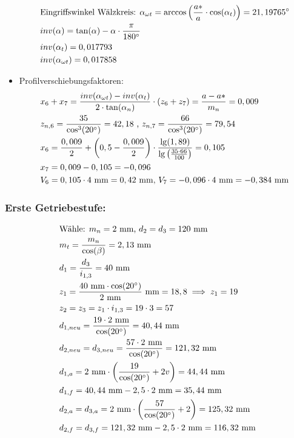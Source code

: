 \begin{itemize}
\begin{align*}
	&\text{Eingriffswinkel Wälzkreis: } \alpha_{\omega t} = \arccos \left( \frac{a*}{a} \cdot \cos(\alpha_t)\right) = 21,19765 ^\circ \\
	&inv(\alpha) = \tan(\alpha) -\alpha \cdot \frac{\pi}{180^\circ} \\
	&inv(\alpha_t) = 0,017793 \\
	&inv(\alpha_{\omega t}) = 0,017858 
\end{align*}
\item Profilverschiebungsfaktoren:
\begin{align*}
	&x_6 + x_7 = \frac{inv(\alpha_{\omega t})-inv(\alpha_{t})}{2 \cdot \tan(\alpha_n)} \cdot (z_6 + z_7) = \frac{a - a*}{m_n} = 0,009 \\
	&z_{n,6} = \frac{35}{\cos^3(20^\circ)} = 42,18 \text{ , }z_{n,7} = \frac{66}{\cos^3(20^\circ)} = 79,54 \\
	&x_6 =\frac{0,009}{2} + \left( 0,5 - \frac{0,009}{2} \right) \cdot \frac{\lg(1,89)}{\lg\left( \frac{35 \cdot 66}{100} \right)} = 0,105 \\
	&x_7 = 0,009 - 0,105 = - 0,096 \\ 
	&V_6 = 0,105 \cdot 4 \text{ mm} = 0,42 \text{ mm, }V_7 = -0,096\cdot 4 \text{ mm} = -0,384 \text{ mm} 
	\end{align*}
\end{itemize}
\subsubsection{Erste Getriebestufe:}
\begin{align*}
	&\text{Wähle: } m_n= 2\text{ mm, } d_2 = d_3 = 120 \text{ mm} \\
	&m_t =  \frac{m_n}{\cos(\beta)} = 2,13 \text{ mm} \\
	&d_1 = \frac{d_3}{i_{1,3}} = 40 \text{ mm} \\
	&z_1 = \frac{40 \text{ mm} \cdot \cos(20^\circ)}{2 \text{ mm}} \text{ mm} = 18,8 \implies z_1 = 19\\
	&z_2=z_3 = z_1 \cdot i_{1,3} =19 \cdot 3 = 57 \\
	&d_{1,neu} = \frac{19 \cdot 2 \text{ mm}}{\cos(20^\circ)} = 40,44 \text{ mm} \\
	&d_{2,neu} = d_{3,neu} = \frac{57 \cdot 2 \text{ mm}}{\cos(20^\circ)} = 121,32 \text{ mm} \\
	&d_{1,a} = 2\text{ mm} \cdot \left(\frac{19}{\cos(20^\circ)}+2v\right) =44,44\text{ mm} \\
	&d_{1,f} = 40,44\text{ mm} -2,5 \cdot 2\text{ mm} =35,44\text{ mm} \\
	&d_{2,a} = d_{3,a} =2\text{ mm} \cdot \left(\frac{57}{\cos(20^\circ)}+2\right) =125,32\text{ mm} \\
	&d_{2,f} =d_{3,f} = 121,32\text{ mm} -2,5 \cdot 2\text{ mm} =116,32\text{ mm} \\
\end{align*}
